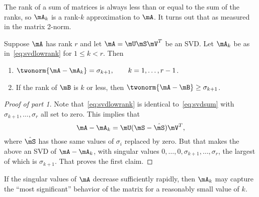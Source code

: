 The rank of a sum of matrices is always less than or equal to the sum of the ranks, so $\mA_k$ is a rank-$k$ approximation to $\mA$. It turns out that  as measured in the matrix 2-norm.
\begin{thm}
  \label{thm:best-rank-k}
  Suppose $\mA$ has rank $r$ and let $\mA=\mU\mS\mV^T$ be an SVD. Let $\mA_k$ be as in~\eqref{eq:svdlowrank} for $1\le k < r$. Then
  \begin{enumerate}
  \item $\twonorm{\mA - \mA_k} = \sigma_{k+1}, \qquad k=1,\ldots,r-1$.
  \item If the rank of $\mB$ is $k$ or less, then $\twonorm{\mA-\mB}\ge \sigma_{k+1}$.
  \end{enumerate}
\end{thm}
\begin{proof}[Proof of part 1]
  Note that~\eqref{eq:svdlowrank} is identical to~\eqref{eq:svdsum} with $\sigma_{k+1},\ldots,\sigma_r$ all set to zero. This implies that
  \begin{equation*}
    \mA - \mA_k = \mU(\mS-\hat{\mS})\mV^T,
  \end{equation*}
  where $\hat{\mS}$ has those same values of $\sigma_i$ replaced by zero. But that makes the above an SVD of $\mA - \mA_k$, with singular values $0,\ldots,0,\sigma_{k+1},\ldots,\sigma_r$, the largest of which is $\sigma_{k+1}$. That proves the first claim.
\end{proof}


%
%
If the singular values of $\mA$ decrease sufficiently rapidly, then $\mA_{k}$ may capture the ``most significant'' behavior of the matrix for a reasonably small value of $k$.

